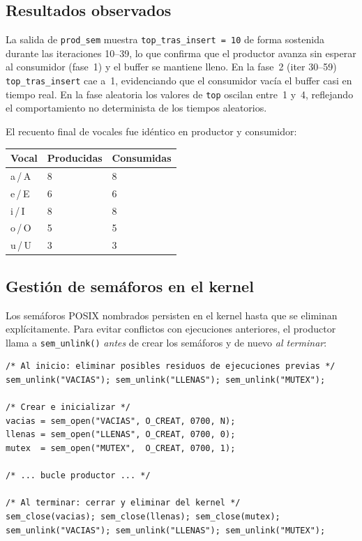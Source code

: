 \documentclass[a4paper, 12pt]{article}
\newcommand{\ic}[1]{\texttt{#1}}
\begin{document}
\subsection{Resultados observados}

La salida de \ic{prod\_sem} muestra \ic{top\_tras\_insert = 10}
de forma sostenida durante las iteraciones 10--39, lo que confirma que el
productor avanza sin esperar al consumidor (fase~1) y el buffer se mantiene
lleno. En la fase~2 (iter 30--59) \ic{top\_tras\_insert} cae a~1,
evidenciando que el consumidor vacía el buffer casi en tiempo real.
En la fase aleatoria los valores de \ic{top} oscilan entre~1 y~4,
reflejando el comportamiento no determinista de los tiempos aleatorios.

El recuento final de vocales fue idéntico en productor y consumidor:

\vspace{0.5em}
\begin{center}
\begin{tabular}{C{3cm} C{3cm} C{3cm}}
  \toprule
  \color{white}\textbf{Vocal} &
  \color{white}\textbf{Producidas} &
  \color{white}\textbf{Consumidas} \\
  \midrule
  a\,/\,A & 8 & 8 \\
  e\,/\,E & 6 & 6 \\
  i\,/\,I & 8 & 8 \\
  o\,/\,O & 5 & 5 \\
  u\,/\,U & 3 & 3 \\
  \bottomrule
\end{tabular}
\end{center}

\subsection{Gestión de semáforos en el kernel}

Los semáforos POSIX nombrados persisten en el kernel hasta que se eliminan
explícitamente. Para evitar conflictos con ejecuciones anteriores, el
productor llama a \ic{sem\_unlink()} \emph{antes} de crear los semáforos y
de nuevo \emph{al terminar}:

\begin{lstlisting}[style=cstyle]
/* Al inicio: eliminar posibles residuos de ejecuciones previas */
sem_unlink("VACIAS"); sem_unlink("LLENAS"); sem_unlink("MUTEX");

/* Crear e inicializar */
vacias = sem_open("VACIAS", O_CREAT, 0700, N);
llenas = sem_open("LLENAS", O_CREAT, 0700, 0);
mutex  = sem_open("MUTEX",  O_CREAT, 0700, 1);

/* ... bucle productor ... */

/* Al terminar: cerrar y eliminar del kernel */
sem_close(vacias); sem_close(llenas); sem_close(mutex);
sem_unlink("VACIAS"); sem_unlink("LLENAS"); sem_unlink("MUTEX");
\end{lstlisting}
\end{document}
